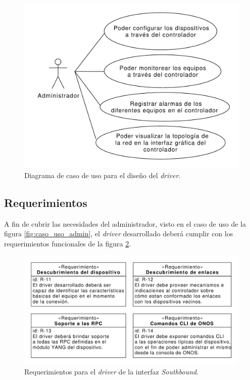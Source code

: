   \begin{figure}[H]
    \centering
    \includegraphics[scale=0.55]{Figures/caso_uso_driver.pdf}
    \caption{Diagrama de caso de uso para el diseño del \textit{driver}.}
    \label{fig:diaguso_driver}
  \end{figure}

  \subsection{Requerimientos}
  A fin de cubrir las necesidades del administrador, visto en el caso de uso de la figura \ref{fig:caso_uso_admin}, el \textit{driver} desarrollado deberá cumplir con los requerimientos funcionales de la figura \ref{fig:req_driver}.
  
  \begin{figure}[H]
    \centering
    \includegraphics[scale=0.65]{Figures/req_driver.pdf}
    \caption{Requerimientos para el \textit{driver} de la interfaz \textit{Southbound}.}
    \label{fig:req_driver}
  \end{figure}

